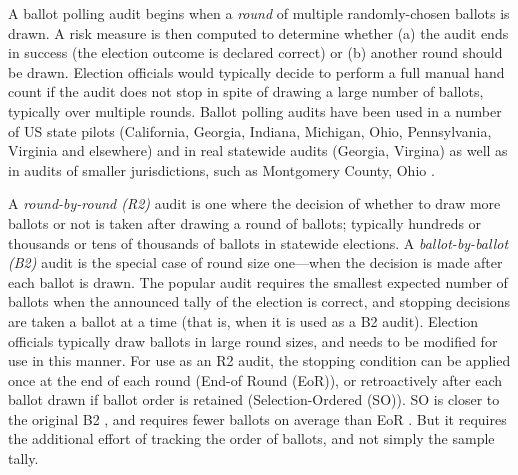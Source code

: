 A ballot polling audit begins when a {\em round} \cite{usenix_minerva} of multiple randomly-chosen ballots is drawn. A risk measure is then computed to determine whether (a) the audit ends in success (the election outcome is declared correct) or (b) another round should be drawn. Election officials would typically decide to perform a full manual hand count if the audit does not stop in spite of drawing a large number of ballots, typically over multiple rounds. Ballot polling audits have been used in a number of US state pilots (California, Georgia, Indiana, Michigan, Ohio, Pennsylvania, Virginia and elsewhere) and in real statewide audits (Georgia, Virgina) \cite{vv_audits} as well as in audits of smaller jurisdictions, such as Montgomery County, Ohio \cite{usenix_minerva}. 

A {\em round-by-round (R2)} audit is one where the decision of whether to draw more ballots or not is taken after drawing a round of ballots; typically hundreds or thousands or tens of thousands of ballots in statewide elections. A {\em ballot-by-ballot (B2)} audit is the special case of round size one---when the decision is made after each ballot is drawn. The popular \BRAVO audit requires the smallest expected number of ballots when the announced tally of the election is correct, and stopping decisions are taken a ballot at a time (that is, when it is used as a B2 audit). Election officials typically draw ballots in large round sizes, and \BRAVO needs to be modified for use in this manner. For use as an R2 audit, the \BRAVO stopping condition can be applied once at the end of each round (End-of Round (EoR)), or retroactively after each ballot drawn if ballot order is retained (Selection-Ordered (SO)). SO \BRAVO is closer to the original B2 \BRAVO, and requires fewer ballots on average than EoR \BRAVO. But it requires the additional effort of tracking the order of ballots, and not simply the sample tally. 

